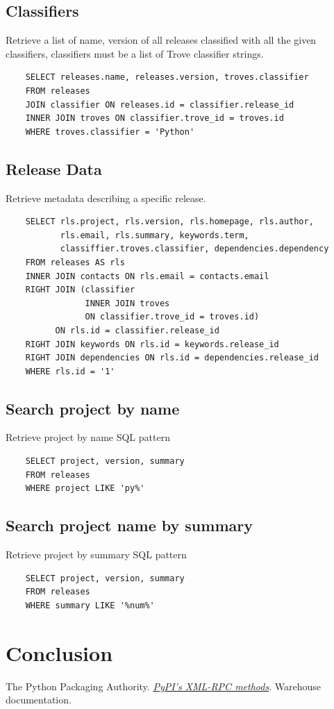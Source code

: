 \documentclass[a4paper,12pt]{article}
\begin{document}
\subsection{Classifiers}
Retrieve a list of name, version of all releases classified with all the given classifiers, classifiers must be a list of Trove classifier strings.
\begin{verbatim}
    SELECT releases.name, releases.version, troves.classifier
    FROM releases
    JOIN classifier ON releases.id = classifier.release_id
    INNER JOIN troves ON classifier.trove_id = troves.id
    WHERE troves.classifier = 'Python'
\end{verbatim}
\subsection{Release Data}
Retrieve metadata describing a specific release.
\begin{verbatim}
    SELECT rls.project, rls.version, rls.homepage, rls.author,
           rls.email, rls.summary, keywords.term,
           classiffier.troves.classifier, dependencies.dependency
    FROM releases AS rls
    INNER JOIN contacts ON rls.email = contacts.email
    RIGHT JOIN (classifier
                INNER JOIN troves
                ON classifier.trove_id = troves.id)
          ON rls.id = classifier.release_id
    RIGHT JOIN keywords ON rls.id = keywords.release_id
    RIGHT JOIN dependencies ON rls.id = dependencies.release_id
    WHERE rls.id = '1'

\end{verbatim}
\subsection{Search project by name}
Retrieve project by name SQL pattern
\begin{verbatim}
    SELECT project, version, summary
    FROM releases
    WHERE project LIKE 'py%'
\end{verbatim}
\subsection{Search project name by summary}
Retrieve project by summary SQL pattern
\begin{verbatim}
    SELECT project, version, summary
    FROM releases
    WHERE summary LIKE '%num%'
\end{verbatim}

\section{Conclusion}

\begin{thebibliography}{69}
    The Python Packaging Authority.
    \href{https://warehouse.readthedocs.io/api-reference/xml-rpc}
         {\emph{PyPI’s XML-RPC methods}}.
    Warehouse documentation.
\end{thebibliography}
\end{document}

